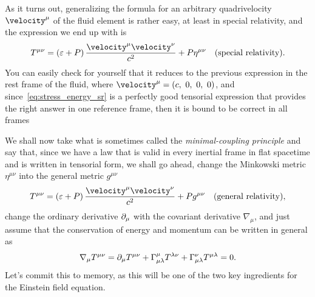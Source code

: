 As it turns out, generalizing the formula for an arbitrary quadrivelocity $\velocity^\mu$
of the fluid element is rather easy, at least in special relativity, and the expression
we end up with is
\begin{align}\label{eq:stress_energy_sr}
  T^{\mu\nu} =
  \left(\edensity + \pressure \right) \frac{\velocity^\mu \velocity^\nu}{c^2} +
  \pressure \eta^{\mu\nu} \quad\text{(special relativity)}.
\end{align}
You can easily check for yourself that it reduces to the previous expression in the
rest frame of the fluid, where $\velocity^\mu = (c,~0,~0,~0)$, and since~\eqref{eq:stress_energy_sr}
is a perfectly good tensorial expression that provides the right answer in one
reference frame, then it is bound to be correct in all frames

We shall now take what is sometimes called the \emph{minimal-coupling principle} and
say that, since we have a law that is valid in every inertial frame in flat spacetime
and is written in tensorial form, we shall go ahead, change the Minkowski metric
$\eta^{\mu\nu}$ into the general metric $g^{\mu\nu}$
\begin{align}
  T^{\mu\nu} = \left(\edensity + \pressure \right) \frac{\velocity^\mu \velocity^\nu}{c^2} +
  \pressure g^{\mu\nu} \quad\text{(general relativity)},
\end{align}
change the ordinary derivative $\partial_{\mu}$ with the covariant derivative $\nabla_\mu$,
and just assume that the conservation of energy and momentum can be written in general as
\begin{align}
  \nabla_\mu T^{\mu\nu} =
  \partial_{\mu} T^{\mu\nu} + \Gamma^{\mu}_{\mu\lambda} T^{\lambda\nu} +
  \Gamma^{\nu}_{\mu\lambda} T^{\mu\lambda} = 0.
\end{align}
Let's commit this to memory, as this will be one of the two key ingredients for the
Einstein field equation.

